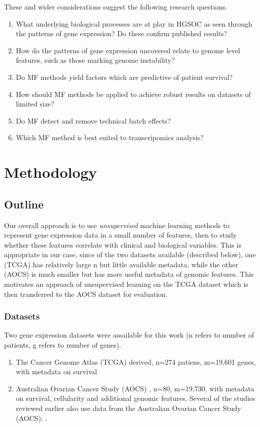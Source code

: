 \documentclass[tikz, 12pt,a4paper,oneside,fleqn]{article}
\begin{document}
These and wider considerations suggest the following research questions.

\begin{enumerate}
\item What underlying biological processes are at play in HGSOC as seen through the patterns of gene expression?  Do these confirm published results?
\item How do the patterns of gene expression uncovered relate to genome level features, such as those marking genome instability?
\item Do MF methods yield factors which are predictive of patient survival?
\item How should MF methods be applied to achieve robust results on datasets of limited size?
\item Do MF detect and remove technical batch effects?
\item Which MF method is best suited to transcripomics analysis?
\end{enumerate}



\section{Methodology}

\subsection{Outline}

Our overall approach is to use \emph{unsupervised} machine learning methods to represent gene expression data in a small number of features, then to study whether these features correlate with clinical and biological variables.  This is appropriate in our case, since of the two datasets available (described below), one (TCGA) has relatively large n but little available metadata, while the other (AOCS) is much smaller but has more useful metadata of genomic features.   This motivates an approach of unsupervised learning on the TCGA dataset which is then transferred to the AOCS dataset for evaluation.

\subsubsection{Datasets}
Two gene expression datasets were assailable for this work (n refers to number of patients, g refers to number of genes).
\begin{enumerate}
\item The Cancer Genome Atlas (TCGA) derived, n=274 patiens, m=19,601 genes, with metadata on survival
\item Australian Ovarian Cancer Study (AOCS) \cite{Patch2015}, n=80, m=19,730, with metadata on survival, cellularity and additional genomic features. Several of the studies reviewed earlier also use data from the Australian Ovarian Cancer Study (AOCS): \cite{Patch2015,Ewing2020,Cuello2018,Au-Yeung2014}.
\end{enumerate}
\end{document}
